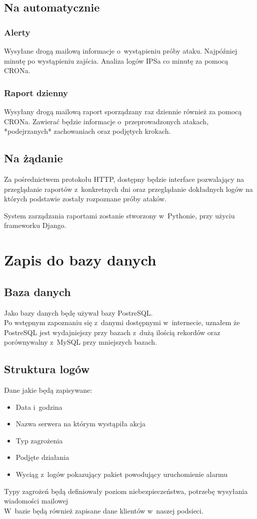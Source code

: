 \documentclass[a4paper,10pt]{article}
\begin{document}
	\subsection{Na automatycznie}
		\subsubsection{Alerty}
			Wysyłane drogą mailową informacje o~wystąpieniu próby ataku. Najpóźniej minutę po wystąpieniu zajścia. Analiza logów IPSa co minutę za pomocą CRON\dywiz a.
		\subsubsection{Raport dzienny}
			Wysyłany drogą mailową raport sporządzany raz dziennie również za pomocą CRON\dywiz a. Zawierać będzie informacje o~przeprowadzonych atakach, *podejrzanych* zachowaniach oraz podjętych krokach.
	\subsection{Na żądanie}
		Za pośrednictwem protokołu HTTP, dostępny będzie interface pozwalający na przeglądanie raportów z~konkretnych dni oraz przeglądanie dokładnych logów na których podstawie zostały rozpoznane próby ataków.
		
		System zarządzania raportami zostanie stworzony w~Pythonie, przy użyciu frameworku Django.
\section{Zapis do bazy danych}
	\subsection{Baza danych}
		Jako bazy danych będę używał bazy PostreSQL.\\
		Po wstępnym zapoznaniu się z~danymi dostępnymi w~internecie, uznałem że PostreSQL jest wydajniejszy przy bazach z~dużą ilością rekordów oraz porównywalny z~MySQL przy mniejszych bazach.
	\subsection{Struktura logów}
		Dane jakie będą zapisywane:
		\begin{itemize}
			\item Data i~godzina
			\item Nazwa serwera na którym wystąpiła akcja
			\item Typ zagrożenia
			\item Podjęte działania
			\item Wyciąg z~logów pokazujący pakiet powodujący uruchomienie alarmu
		\end{itemize}
		Typy zagrożeń będą definiowały poziom niebezpieczeństwa, potrzebę wysyłania wiadomości mailowej\\
		W~bazie będą również zapisane dane klientów w~naszej podsieci.	
\end{document}

